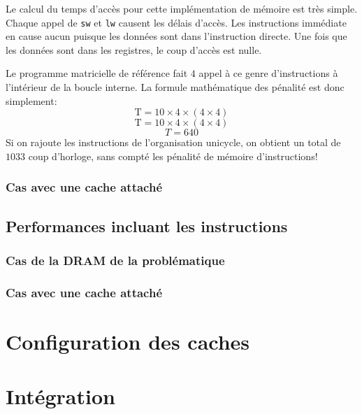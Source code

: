 \documentclass[a11paper]{article}
\begin{document}
Le calcul du temps d'accès pour cette implémentation de mémoire est très simple. Chaque appel de \verb|sw| et \verb|lw| causent les délais d'accès. Les instructions immédiate en
cause aucun puisque les données sont dans l'instruction directe. Une fois que les données sont dans les registres, le coup d'accès est nulle.

Le programme matricielle de référence fait $4$ appel à ce genre d'instructions à l'intérieur de la boucle interne. La formule mathématique des pénalité est donc simplement:
$$
\text{T} = 10\times4\times(4\times4)
$$
$$
\text{T} = 10\times4\times(4\times4)
$$
$$
T=640
$$
Si on rajoute les instructions de l'organisation unicycle, on obtient un total de $1033$ coup d'horloge, sans compté les pénalité de mémoire d'instructions!

\subsubsection{Cas avec une cache attaché}

\subsection{Performances incluant les instructions}
\subsubsection{Cas de la DRAM de la problématique}

\subsubsection{Cas avec une cache attaché}



\section{Configuration des caches}

\section{Intégration}
\end{document}
